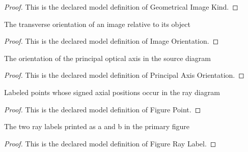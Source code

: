 \begin{proof}
  This is the declared model definition of Geometrical Image Kind.
\end{proof}
\begin{definition}
  \label{def:physics:phyx-mini-0053:phyxminiproblems-problemphyxmini0053-imageorientation}
  The transverse orientation of an image relative to its object
\end{definition}
\begin{proof}
  This is the declared model definition of Image Orientation.
\end{proof}
\begin{definition}
  \label{def:physics:phyx-mini-0053:phyxminiproblems-problemphyxmini0053-principalaxisorientation}
  The orientation of the principal optical axis in the source diagram
\end{definition}
\begin{proof}
  This is the declared model definition of Principal Axis Orientation.
\end{proof}
\begin{definition}
  \label{def:physics:phyx-mini-0053:phyxminiproblems-problemphyxmini0053-figurepoint}
  Labeled points whose signed axial positions occur in the ray diagram
\end{definition}
\begin{proof}
  This is the declared model definition of Figure Point.
\end{proof}
\begin{definition}
  \label{def:physics:phyx-mini-0053:phyxminiproblems-problemphyxmini0053-figureraylabel}
  The two ray labels printed as a and b in the primary figure
\end{definition}
\begin{proof}
  This is the declared model definition of Figure Ray Label.
\end{proof}
